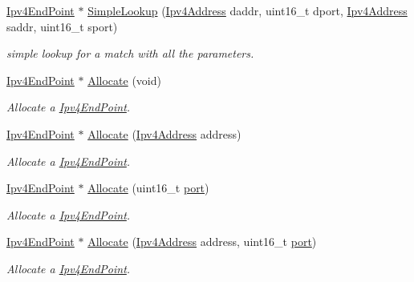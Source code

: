 \begin{DoxyCompactItemize}
\hyperlink{classns3_1_1Ipv4EndPoint}{Ipv4\+End\+Point} $\ast$ \hyperlink{classns3_1_1Ipv4EndPointDemux_a524bb724e8bbd40648172938758860ec}{Simple\+Lookup} (\hyperlink{classns3_1_1Ipv4Address}{Ipv4\+Address} daddr, uint16\+\_\+t dport, \hyperlink{classns3_1_1Ipv4Address}{Ipv4\+Address} saddr, uint16\+\_\+t sport)
\begin{DoxyCompactList}\small\item\em simple lookup for a match with all the parameters. \end{DoxyCompactList}\item 
\hyperlink{classns3_1_1Ipv4EndPoint}{Ipv4\+End\+Point} $\ast$ \hyperlink{classns3_1_1Ipv4EndPointDemux_a95eef225abf664ea72523730e00e621e}{Allocate} (void)
\begin{DoxyCompactList}\small\item\em Allocate a \hyperlink{classns3_1_1Ipv4EndPoint}{Ipv4\+End\+Point}. \end{DoxyCompactList}\item 
\hyperlink{classns3_1_1Ipv4EndPoint}{Ipv4\+End\+Point} $\ast$ \hyperlink{classns3_1_1Ipv4EndPointDemux_a7a76c96cfe7633b411a41624746a0e0d}{Allocate} (\hyperlink{classns3_1_1Ipv4Address}{Ipv4\+Address} address)
\begin{DoxyCompactList}\small\item\em Allocate a \hyperlink{classns3_1_1Ipv4EndPoint}{Ipv4\+End\+Point}. \end{DoxyCompactList}\item 
\hyperlink{classns3_1_1Ipv4EndPoint}{Ipv4\+End\+Point} $\ast$ \hyperlink{classns3_1_1Ipv4EndPointDemux_a7e9501178cf466e3146f5d94fecec01f}{Allocate} (uint16\+\_\+t \hyperlink{visualizer-ideas_8txt_a21ff1c530daf8435e00048b7fc2c58e3}{port})
\begin{DoxyCompactList}\small\item\em Allocate a \hyperlink{classns3_1_1Ipv4EndPoint}{Ipv4\+End\+Point}. \end{DoxyCompactList}\item 
\hyperlink{classns3_1_1Ipv4EndPoint}{Ipv4\+End\+Point} $\ast$ \hyperlink{classns3_1_1Ipv4EndPointDemux_a2e0a73cf74c73c9b2be5a4dd5a1635a6}{Allocate} (\hyperlink{classns3_1_1Ipv4Address}{Ipv4\+Address} address, uint16\+\_\+t \hyperlink{visualizer-ideas_8txt_a21ff1c530daf8435e00048b7fc2c58e3}{port})
\begin{DoxyCompactList}\small\item\em Allocate a \hyperlink{classns3_1_1Ipv4EndPoint}{Ipv4\+End\+Point}. \end{DoxyCompactList}\item 

\end{DoxyCompactItemize}
